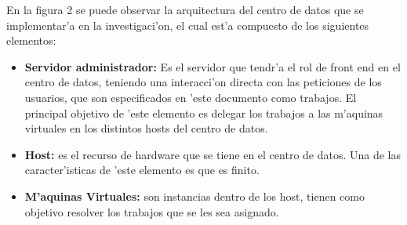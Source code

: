 En la figura 2 se puede observar la arquitectura del centro de datos que se implementar'a en la investigaci'on, el cual est'a compuesto de los siguientes elementos:

\begin{itemize}
\item \textbf{Servidor administrador:} Es el servidor que tendr'a el rol de front end en el centro de datos, teniendo una interacci'on directa con las peticiones de los usuarios, que son especificados en 'este documento como trabajos.
El principal objetivo de 'este elemento es delegar los trabajos a las m'aquinas virtuales en los distintos hosts del centro de datos.
\item \textbf{Host:} es el recurso de hardware que se tiene en el centro de datos. Una de las caracter'isticas de 'este elemento es que es finito.
\item \textbf{M'aquinas Virtuales:} son instancias dentro de los host, tienen como objetivo resolver los trabajos que se les sea asignado.


\end{itemize}